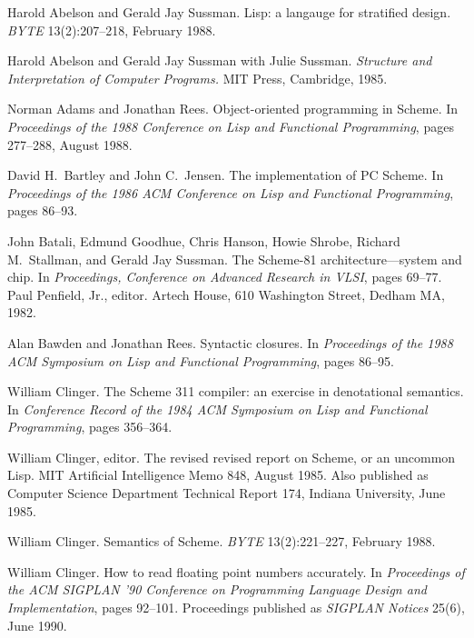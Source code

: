 \begin{thebibliography}{999}

Harold Abelson and Gerald Jay Sussman.
Lisp: a langauge for stratified design.
{\em BYTE} 13(2):207--218, February 1988.

Harold Abelson and Gerald Jay Sussman with Julie Sussman.
{\em Structure and Interpretation of Computer Programs.}
MIT Press, Cambridge, 1985.

Norman Adams and Jonathan Rees.
Object-oriented programming in Scheme.
In {\em Proceedings of the 1988 Conference on Lisp
  and Functional Programming}, pages 277--288, August 1988.

David H.~Bartley and John C.~Jensen.
The implementation of PC Scheme.
In {\em Proceedings of the 1986 ACM Conference on Lisp
  and Functional Programming}, pages 86--93.

John Batali, Edmund Goodhue, Chris Hanson, Howie Shrobe, Richard
  M.~Stallman, and Gerald Jay Sussman.
The Scheme-81 architecture---system and chip.
In {\em Proceedings, Conference on Advanced Research in VLSI},
  pages 69--77.
Paul Penfield, Jr., editor.
Artech House, 610 Washington Street, Dedham MA, 1982.

Alan Bawden and Jonathan Rees.
Syntactic closures.
In {\em Proceedings of the 1988 ACM Symposium on Lisp and
  Functional Programming}, pages 86--95.


William Clinger.
The Scheme 311 compiler: an exercise in denotational semantics.
In {\em Conference Record of the 1984 ACM Symposium on Lisp and
  Functional Programming}, pages 356--364.

William Clinger, editor.
The revised revised report on Scheme, or an uncommon Lisp.
MIT Artificial Intelligence Memo 848, August 1985.
Also published as Computer Science Department Technical Report 174,
  Indiana University, June 1985.

William Clinger.
Semantics of Scheme.
{\em BYTE} 13(2):221--227, February 1988.

William Clinger.
How to read floating point numbers accurately.
In {\em Proceedings of the ACM SIGPLAN '90 Conference
  on Programming Language Design and Implementation}, pages 92--101.
Proceedings published as {\em SIGPLAN Notices} 25(6), June 1990.


\end{thebibliography}
